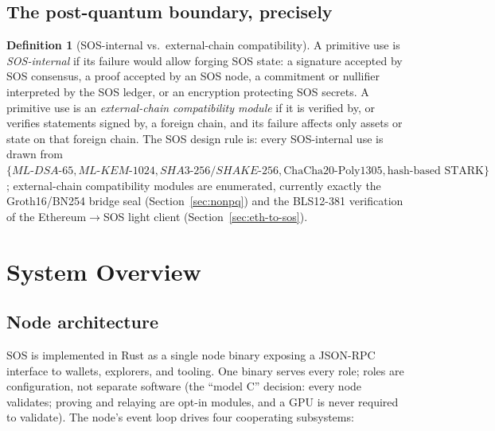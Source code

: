 \documentclass[11pt]{article}
\newcommand{\mldsa}{ML\mbox{-}DSA\mbox{-}65}
\newcommand{\mlkem}{ML\mbox{-}KEM\mbox{-}1024}
\newcommand{\shake}{SHAKE\mbox{-}256}
\newcommand{\sha}{SHA3\mbox{-}256}
\theoremstyle{plain}
\theoremstyle{definition}
\newtheorem{definition}[theorem]{Definition}
\theoremstyle{remark}
\begin{document}
\subsection{The post-quantum boundary, precisely}
\label{sec:boundary-def}

\begin{definition}[SOS-internal vs.\ external-chain compatibility]
\label{def:boundary}
A primitive use is \emph{SOS-internal} if its failure would allow forging SOS
state: a signature accepted by SOS consensus, a proof accepted by an SOS node,
a commitment or nullifier interpreted by the SOS ledger, or an encryption
protecting SOS secrets. A primitive use is an \emph{external-chain
compatibility module} if it is verified by, or verifies statements signed by,
a foreign chain, and its failure affects only assets or state on that foreign
chain. The SOS design rule is: every SOS-internal use is drawn from
$\{\mldsa{}, \mlkem{}, \sha{}/\shake{}, \text{ChaCha20-Poly1305},
\text{hash-based STARK}\}$; external-chain compatibility modules are
enumerated, currently exactly the Groth16/BN254 bridge seal
(Section~\ref{sec:nonpq}) and the BLS12-381 verification of the
Ethereum$\to$SOS light client (Section~\ref{sec:eth-to-sos}).
\end{definition}

\section{System Overview}
\label{sec:overview}

\subsection{Node architecture}

SOS is implemented in Rust as a single node binary exposing a JSON-RPC
interface to wallets, explorers, and tooling. One binary serves every role;
roles are configuration, not separate software (the ``model C'' decision:
every node validates; proving and relaying are opt-in modules, and a GPU is
never required to validate). The node's event loop drives four cooperating
subsystems:
\end{document}
